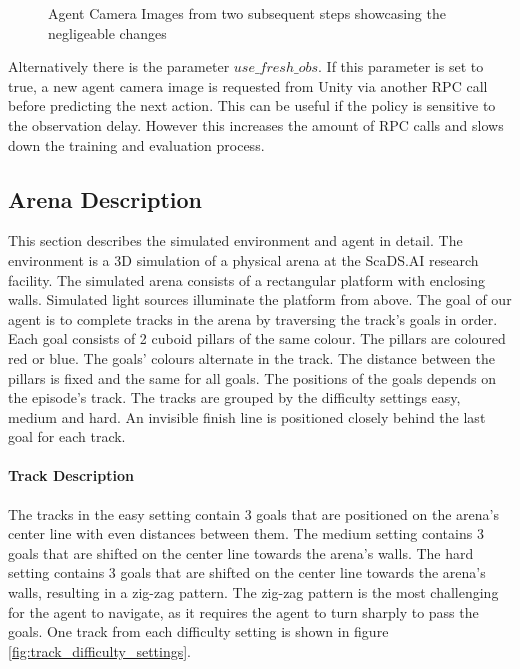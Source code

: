\begin{figure}
    \centering
    \caption{Agent Camera Images from two subsequent steps showcasing the negligeable changes}
    \label{fig:delay}
\end{figure}

Alternatively there is the parameter $use\_fresh\_obs$. If this parameter is set to true, a new agent camera image is requested from Unity via another \ac{RPC} call before predicting the next action. This can be useful if the policy is sensitive to the observation delay. However this increases the amount of \ac{RPC} calls and slows down the training and evaluation process.



\subsection{Arena Description}


This section describes the simulated environment and agent in detail. The environment is a 3D simulation of a physical arena at the ScaDS.AI research facility. The simulated arena consists of a rectangular platform with enclosing walls. Simulated light sources illuminate the platform from above.
The goal of our agent is to complete tracks in the arena by traversing the track's goals in order. Each goal consists of 2 cuboid pillars of the same colour. The pillars are coloured red or blue. The goals' colours alternate in the track. The distance between the pillars is fixed and the same for all goals. The positions of the goals depends on the episode's track. The tracks are grouped by the difficulty settings easy, medium and hard. An invisible finish line is positioned closely behind the last goal for each track.


\paragraph{Track Description}
The tracks in the easy setting contain 3 goals that are positioned on the arena's center line with even distances between them. The medium setting contains 3 goals that are shifted on the center line towards the arena's walls. The hard setting contains 3 goals that are shifted on the center line towards the arena's walls, resulting in a zig-zag pattern. The zig-zag pattern is the most challenging for the agent to navigate, as it requires the agent to turn sharply to pass the goals. One track from each difficulty setting is shown in figure \ref{fig:track_difficulty_settings}. 

